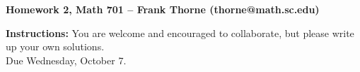 \documentclass[12pt]{article}
\begin{document}
\setlength{\topmargin}{-2mm}



\newcommand{\sump}{\sideset{}{'}\sum}
\newcommand{\Aa}{{\alpha}}
\newcommand{\cD}{\mathcal{D}}
\newcommand{\C}{\mathbb{C}}
\newcommand{\N}{{\rm{N}}}
\newcommand{\re}{{\rm{max\,red}}}
\newcommand{\nonmax}{{\rm{nonmax}}}
\newcommand{\ma}{{\rm{max}}}
\newcommand{\PGL}{{\rm{PGL}}}
\newcommand{\diag}{{\rm{diag}}}
\newcommand{\sqf}{{\rm{sqf}}}
\newcommand{\Z}{\mathbb{Z}}
\renewcommand{\P}{\mathbb{P}}
\newcommand{\Q}{\mathbb{Q}}
\newcommand{\R}{\mathbb{R}}
\newcommand{\F}{\mathbb{F}}
\newcommand{\FF}{\mathcal{F}}
\newcommand{\OO}{\mathcal{O}}
\newcommand{\A}{\mathbb{A}}
\newcommand{\QQ}{\mathcal{Q}}
\newcommand{\calA}{\mathcal{A}}
\newcommand{\calS}{\mathcal{S}}
\newcommand{\calB}{\mathcal{B}}
\newcommand{\calP}{\mathcal{P}}
\newcommand{\calF}{\mathcal{F}}
\newcommand{\calZ}{\mathcal{Z}}
\newcommand{\calT}{\mathcal{T}}
\newcommand{\calO}{\mathcal{O}}
\newcommand{\Y}{\mathcal{Y}}
\newcommand{\GQ}{G_{\Q}}
\newcommand{\Qbar}{\bar{\Q}}
\newcommand{\ra}{\rightarrow}
\newcommand\Hom{\operatorname{Hom}}
\newcommand\Tr{\operatorname{Tr}}
\newcommand\Aut{\operatorname{Aut}}
\newcommand\Sym{\operatorname{Sym}}
\newcommand\Disc{\operatorname{Disc}}
\newcommand\Vol{\operatorname{Vol}}
\newcommand\Out{\operatorname{Out}}
\newcommand\im{\operatorname{im}}
\renewcommand\div{\operatorname{div}}
\newcommand\irr{\textnormal{irr}}
\newcommand\Stab{\operatorname{Stab}}
\newcommand\Gal{\operatorname{Gal}}
\newcommand\Res{\operatorname{Res}}
\newcommand\SL{\operatorname{SL}}
\newcommand\GL{\operatorname{GL}}
\newcommand\SO{\operatorname{SO}}
\newcommand\ur{\operatorname{ur}}
\newcommand\sr{\operatorname{sr}}
\newcommand\htt{\operatorname{ht}}
\newcommand{\cO}{\mathcal{O}}
\newcommand{\co}{\mathcal{O}}
\newcommand\codim{\operatorname{codim}}


\newcommand{\odr}{\co_{D1^2}}		%
\newcommand{\ods}{\co_{D11}}		%
\newcommand{\odi}{\co_{D2}}		%
\newcommand{\odg}{\co_{D\rm{ns}}}	%
\newcommand{\ocs}{\co_{C\rm{s}}}	%
\newcommand{\ocg}{\co_{C\rm{ns}}}	%
\newcommand{\ots}{\co_{B11}}		%
\newcommand{\oti}{\co_{B2}}		%



\begin{center}{\bf Homework 2, Math 701 -- Frank Thorne (thorne@math.sc.edu)}
\end{center}
\begin{center}
{\bf Instructions:} You are welcome and encouraged to collaborate, but please write up your own solutions. \\

Due Wednesday, October 7.
\end{center}
\end{document}
